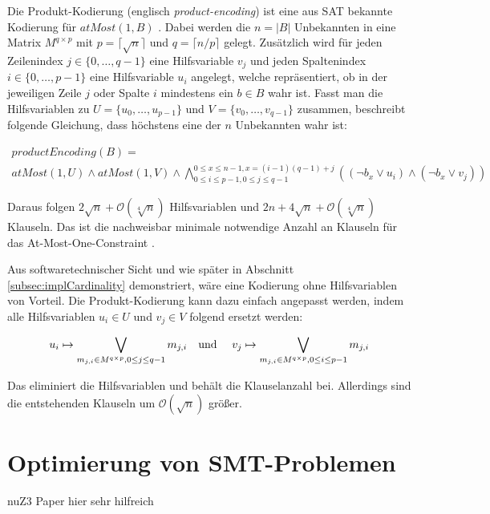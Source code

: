 Die Produkt-Kodierung (englisch \textit{product-encoding}) ist eine aus SAT bekannte Kodierung für $atMost(1,B)$ \cite{amoChen}.
Dabei werden die $n = \lvert B \rvert$ Unbekannten in eine Matrix $M^{q \times p}$ mit $p = \lceil \sqrt {n} \rceil$ und $q = \lceil n/p \rceil$ gelegt.
Zusätzlich wird für jeden Zeilenindex $j \in \{0,\ldots,q-1\}$ eine Hilfsvariable $v_j$ und jeden Spaltenindex $i \in \{0,\ldots,p-1\}$ eine Hilfsvariable $u_i$ angelegt,
welche repräsentiert, ob in der jeweiligen Zeile $j$ oder Spalte $i$ mindestens ein $b \in B$ wahr ist.
Fasst man die Hilfsvariablen zu $U = \{ u_0,\ldots, u_{p-1} \}$ und $V = \{ v_0,\ldots, v_{q-1} \}$ zusammen, beschreibt folgende Gleichung,
dass höchstens eine der $n$ Unbekannten wahr ist:

\begin{multline*}
    productEncoding(B) = \\
    atMost(1,U) \land atMost(1,V) \land \bigwedge_{0 \leq i \leq p-1, 0 \leq j \leq q-1}^{0 \leq x \leq n-1, x = (i-1)(q-1)+j} ((\neg b_x \lor u_i) \land (\neg b_x \lor v_j) )
\end{multline*}

Daraus folgen $2 \sqrt{n} + \mathcal{O}(\sqrt[4]{n})$ Hilfsvariablen und $2n + 4\sqrt{n} + \mathcal{O}(\sqrt[4]{n})$ Klauseln.
Das ist die nachweisbar minimale notwendige Anzahl an Klauseln für das At-Most-One-Constraint \cite{amoChen, lowerBoundAMO}.


Aus softwaretechnischer Sicht und wie später in Abschnitt \ref{subsec:implCardinality} demonstriert, wäre eine Kodierung ohne Hilfsvariablen von Vorteil.
Die Produkt-Kodierung kann dazu einfach angepasst werden, indem alle Hilfsvariablen $u_i \in U$ und $v_j \in V$ folgend ersetzt werden:

\[
    u_i \mapsto \bigvee_{m_{j,i} \in M^{q \times p}, 0 \leq j \leq q-1} m_{j,i} \text{\quad und \quad}
    v_j \mapsto \bigvee_{m_{j,i} \in M^{q \times p}, 0 \leq i \leq p-1} m_{j,i}
\]

Das eliminiert die Hilfsvariablen und behält die Klauselanzahl bei.
Allerdings sind die entstehenden Klauseln um $\mathcal{O}(\sqrt{n})$ größer.

\section{Optimierung von SMT-Problemen}
nuZ3 Paper hier sehr hilfreich \cite{nuz3}
